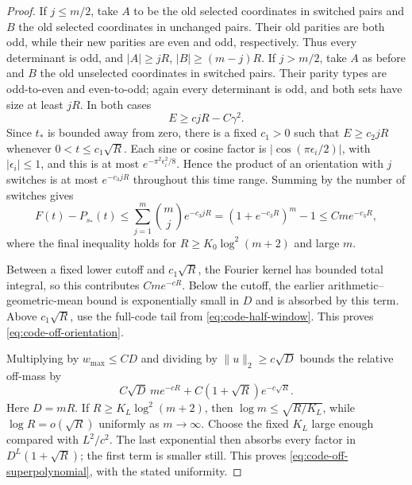 \begin{proof}
If $j\le m/2$, take $A$ to be the old selected coordinates in switched
pairs and $B$ the old selected coordinates in unchanged pairs.
Their old parities are both odd, while their new parities are even
and odd, respectively. Thus every determinant is odd, and
$|A|\ge jR$, $|B|\ge(m-j)R$.
If $j>m/2$, take $A$ as before and $B$ the old unselected coordinates
in switched pairs. Their parity types are odd-to-even and even-to-odd;
again every determinant is odd, and both sets have size at least $jR$.
In both cases
\[
 E\ge c jR-C\gamma^2.
\]
Since $t_*$ is bounded away from zero, there is a fixed $c_1>0$ such
that $E\ge c_2jR$ whenever $0<t\le c_1\sqrt R$.
Each sine or cosine factor is $|\cos(\pi\epsilon_i/2)|$, with
$|\epsilon_i|\le1$, and this is at most
$e^{-\pi^2\epsilon_i^2/8}$. Hence the product of an orientation
with $j$ switches is at most $e^{-c_3jR}$ throughout this time range.
Summing by the number of switches gives
\[
 F(t)-P_{s_*}(t)
 \le\sum_{j=1}^m\binom mj e^{-c_3jR}
 =(1+e^{-c_3R})^m-1\le Cm e^{-c_3R},
\]
where the final inequality holds for $R\ge K_0\log^2(m+2)$ and
large $m$.

Between a fixed lower cutoff and $c_1\sqrt R$, the Fourier kernel
has bounded total integral, so this contributes $Cm e^{-cR}$.
Below the cutoff, the earlier arithmetic--geometric-mean bound is
exponentially small in $D$ and is absorbed by this term. Above
$c_1\sqrt R$, use the full-code tail from
\eqref{eq:code-half-window}. This proves
\eqref{eq:code-off-orientation}.

Multiplying by $w_{\max}\le CD$ and dividing by
$\|u\|_2\ge c\sqrt D$ bounds the relative off-mass by
\[
 C\sqrt D\,m e^{-cR}+C(1+\sqrt R)e^{-c\sqrt R}.
\]
Here $D=mR$. If $R\ge K_L\log^2(m+2)$, then
$\log m\le\sqrt{R/K_L}$, while $\log R=o(\sqrt R)$ uniformly
as $m\to\infty$. Choose the fixed $K_L$ large enough compared with
$L^2/c^2$. The last exponential then absorbs every factor in
$D^L(1+\sqrt R)$; the first term is smaller still. This proves
\eqref{eq:code-off-superpolynomial}, with the stated uniformity.
\end{proof}
